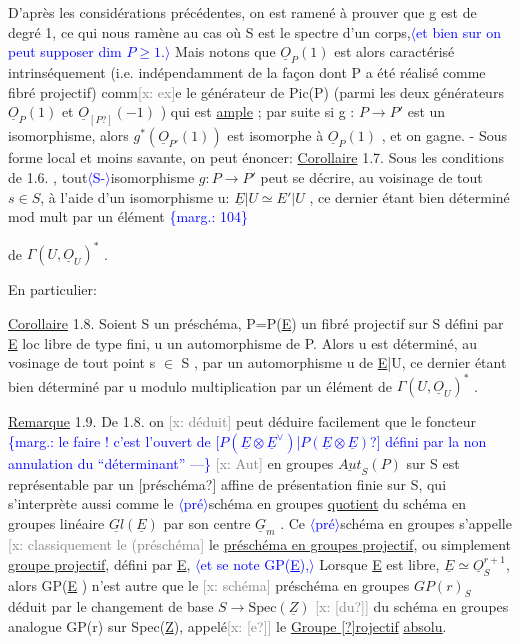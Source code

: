 \documentclass[11pt]{article}
\newcommand{\scanpage}[1]{\par\bigskip\noindent{\small\sffamily[scan #1]}\par}
\newcommand{\mspage}[1]{{\small\sffamily[p.\,#1]}}
\newcommand{\hand}[1]{\textcolor{blue}{#1}}
\let\over\relax
\newcommand{\over}[2]{\textcolor{gray}{#1}\textcolor{blue}{\ensuremath{^{\!\nearrow}}#2}}
\newcommand{\inserted}[2][]{\textcolor{blue}{$\langle$#2$\rangle$}}
\newcommand{\margin}[1]{\textcolor{blue}{\{\textsf{marg.:} #1\}}}
\newcommand{\xout}[1]{\textcolor{gray}{[\textsf{x:} #1]}}
\newcommand{\uline}[1]{\underline{#1}}
\newcommand{\uuline}[1]{\underline{\underline{#1}}}
\newcommand{\unsure}[1]{[#1?]}
\begin{document}
D'après les considérations précédentes, on est ramené à prouver
que g est de degré 1, ce qui nous ramène au cas où S est le spectre d'un
corps,\inserted[typed]{et bien sur on peut supposer dim $P\geq 1$.} Mais notons que $\underline{O}_P(1)$ est alors caractérisé intrinséquement (i.e.
indépendamment de la façon dont P a été réalisé comme fibré projectif)
comm\xout{ex}e le générateur de Pic(P) (parmi les deux générateurs $\underline{O}_P(1)$ et
$\underline{O}_{\unsure{P}}(-1)$ ) qui est \uline{ample} ; par suite si g : $P\to P'$ est un isomorphisme,
alors $g^{*}(\underline{O}_{P'}(1))$ est isomorphe à $\underline{O}_P(1)$ , et on gagne. - Sous forme local
et moins savante, on peut énoncer:
\uline{Corollaire} 1.7. Sous les conditions de 1.6. , tout\inserted{S-}isomorphisme $g:P\to P'$
peut se décrire, au voisinage de tout $s\in S$, à l'aide d'un isomorphisme
u: $\underline{E}|U \simeq E'|U$ , ce dernier étant bien déterminé mod mult par un élément
\margin{104}

\clearpage
\scanpage{25/105}
\mspage{8}

de $\Gamma(U,\underline{O}_U)^*$ .

En particulier:

\uline{Corollaire} 1.8. Soient S un préschéma, P=P(\underline{E}) un fibré projectif sur S
défini par \underline{E} loc libre de type fini, u un automorphisme de P. Alors u
est déterminé, au vosinage de tout point s $\in$ S , par un automorphisme
u de \underline{E}|U, ce dernier étant bien déterminé par u modulo multiplication par
un élément de $\Gamma(U,\underline{O}_U)^*$ .

\uline{Remarque} 1.9. De 1.8. on \xout{déduit} peut déduire facilement que le foncteur \margin{le faire ! c'est l'ouvert de \unsure{$P(\underline{E}\otimes\underline{E}^{\vee})$|$P(\underline{E}\otimes\underline{E})$} défini par la non annulation du ``déterminant'' ---}
\xout{Aut} en groupes $\underline{Aut}_S(P)$ sur S est représentable par un \unsure{préschéma} affine
de présentation finie sur S, qui s'interprète aussi comme le \inserted{pré}schéma en
groupes \uline{quotient} du schéma en groupes linéaire $\underline{Gl}(\underline{E})$ par son centre
$\underline{G}_m$ . Ce \inserted{pré}schéma en groupes s'appelle \xout{classiquement le (préschéma}
le \uline{préschéma en groupes projectif}, ou simplement \uline{groupe projectif}, défini
par \underline{E}, \inserted[typed]{et se note GP(\underline{E})\hand{,}} Lorsque \underline{E} est libre, $\underline{E}\simeq\underline{O}_S^{r+1}$, alors GP(\underline{E} ) n'est autre que le
\xout{schéma} préschéma en groupes $GP(r)_S$ déduit par le changement de base
$S\to\mathrm{Spec}(\underline{Z})$ \xout{\unsure{du}} du schéma en groupes analogue GP(r) sur Spec(\underline{Z}), appelé\xout{\unsure{e}}
le \uline{Groupe \unsure{\over{p}{P}}rojectif} \uuline{absolu}.
\end{document}
